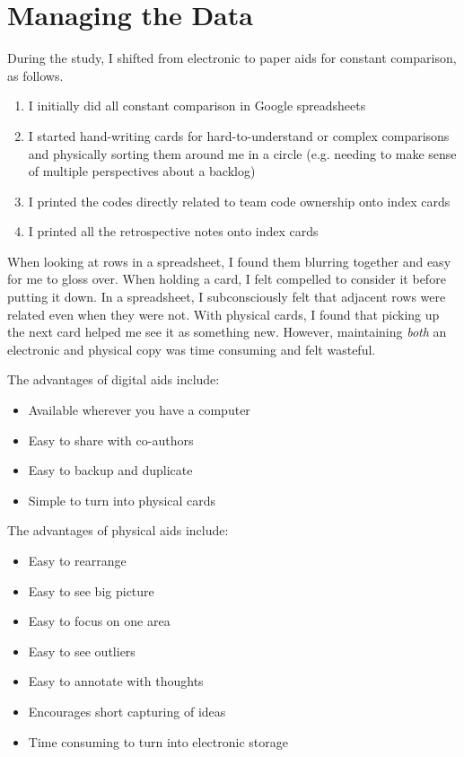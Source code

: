 \section{Managing the Data}
\label{ManagingTheData}
During the study, I shifted from electronic to paper aids for constant comparison, as follows. 
\begin{enumerate}
  \item I initially did all constant comparison in Google spreadsheets
  \item I started hand-writing cards for hard-to-understand or complex comparisons and physically sorting them around me in a circle (e.g. needing to make sense of multiple perspectives about a backlog)
  \item I printed the codes directly related to team code ownership onto index cards
  \item I printed all the retrospective notes onto index cards
\end{enumerate}

When looking at rows in a spreadsheet, I found them blurring together and easy for me to gloss over. When holding a card, I felt compelled to consider it before putting it down. In a spreadsheet, I subconsciously felt that adjacent rows were related even when they were not. With physical cards, I found that picking up the next card helped me see it as something new. However, maintaining \textit{both} an electronic and physical copy was time consuming and felt wasteful.

The advantages of digital aids include:
\begin{itemize}
  \item Available wherever you have a computer
  \item Easy to share with co-authors
  \item Easy to backup and duplicate
  \item Simple to turn into physical cards
\end{itemize}

The advantages of physical aids include:
\begin{itemize}
  \item Easy to rearrange
  \item Easy to see big picture 
  \item Easy to focus on one area
  \item Easy to see outliers
  \item Easy to annotate with thoughts
  \item Encourages short capturing of ideas
  \item Time consuming to turn into electronic storage
\end{itemize}

